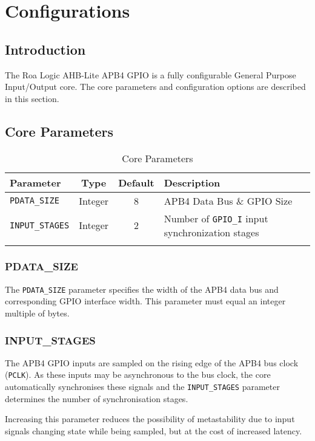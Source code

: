 \chapter{Configurations}\label{configurations}

\section{Introduction}\label{introduction-1}

The Roa Logic AHB-Lite APB4 GPIO is a fully configurable General Purpose
Input/Output core. The core parameters and configuration options are
described in this section.

\section{Core Parameters}\label{core-parameters}

\begin{longtable}[]{@{}lccl@{}}
\toprule
Parameter & Type & Default & Description\tabularnewline
\midrule
\endhead
\texttt{PDATA\_SIZE} & Integer & 8 & APB4 Data Bus \& GPIO Size\tabularnewline
\texttt{INPUT\_STAGES} & Integer & 2 & Number of \texttt{GPIO\_I} input synchronization
stages\tabularnewline
\bottomrule
\caption{Core Parameters}
\end{longtable}

\subsection{PDATA\_SIZE}\label{pdata_size}

The \texttt{PDATA\_SIZE} parameter specifies the width of the APB4 data bus and
corresponding GPIO interface width. This parameter must equal an integer
multiple of bytes.

\subsection{INPUT\_STAGES}\label{input_stages}

The APB4 GPIO inputs are sampled on the rising edge of the APB4 bus
clock (\texttt{PCLK}). As these inputs may be asynchronous to the bus clock, the
core automatically synchronises these signals and the \texttt{INPUT\_STAGES}
parameter determines the number of synchronisation stages.

Increasing this parameter reduces the possibility of metastability due
to input signals changing state while being sampled, but at the cost of
increased latency.

